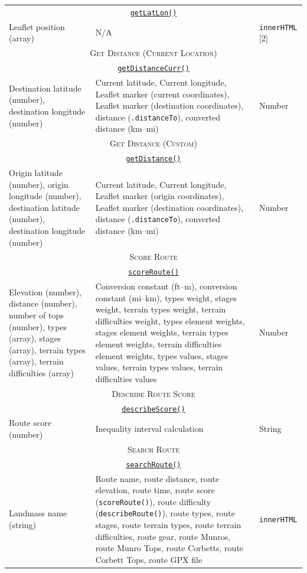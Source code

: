 \documentclass[11pt, english]{article}
\begin{document}
\begin{center}
\begin{longtable}{p{4cm}p{6cm}p{2cm}}
		\hline
		\multicolumn{3}{c}{\underline{\texttt{getLatLon()}}}\\
		Leaflet position (array) & N/A & \texttt{innerHTML} [2]\\
		\hline
		\multicolumn{3}{c}{\textsc{Get Distance (Current Location)}}\\
		\hline
		\multicolumn{3}{c}{\underline{\texttt{getDistanceCurr()}}}\\
		Destination latitude (number), destination longitude (number) & Current latitude, Current longitude, Leaflet marker (current coordinates), Leaflet marker (destination coordinates), distance (\texttt{.distanceTo}), converted distance (km--mi) & Number\\
		\hline
		\multicolumn{3}{c}{\textsc{Get Distance (Custom)}}\\
		\hline
		\multicolumn{3}{c}{\underline{\texttt{getDistance()}}}\\
		Origin latitude (number), origin longitude (number), destination latitude (number), destination longitude (number) & Current latitude, Current longitude, Leaflet marker (origin coordinates), Leaflet marker (destination coordinates), distance (\texttt{.distanceTo}), converted distance (km--mi) & Number\\
		\hline
		\multicolumn{3}{c}{\textsc{Score Route}}\\
		\hline
		\multicolumn{3}{c}{\underline{\texttt{scoreRoute()}}}\\
		Elevation (number), distance (number), number of tops (number), types (array), stages (array), terrain types (array), terrain difficulties (array) & Conversion constant (ft--m), conversion constant (mi--km), types weight, stages weight, terrain types weight, terrain difficulties weight, types element weights, stages element weights, terrain types element weights, terrain difficulties element weights, types values, stages values, terrain types values, terrain difficulties values & Number\\
		\hline
		\multicolumn{3}{c}{\textsc{Describe Route Score}}\\
		\hline
		\multicolumn{3}{c}{\underline{\texttt{describeScore()}}}\\
		Route score (number) & Inequality interval calculation & String\\
		\hline
		\multicolumn{3}{c}{\textsc{Search Route}}\\
		\hline
		\multicolumn{3}{c}{\underline{\texttt{searchRoute()}}}\\
		Landmass name (string) & Route name, route distance, route elevation, route time, route score (\texttt{scoreRoute()}), route difficulty (\texttt{describeRoute()}), route types, route stages, route terrain types, route terrain difficulties, route gear, route Munros, route Munro Tops, route Corbetts, route Corbett Tops, route GPX file & \texttt{innerHTML}\\

\end{longtable}
\end{center}
\end{document}
